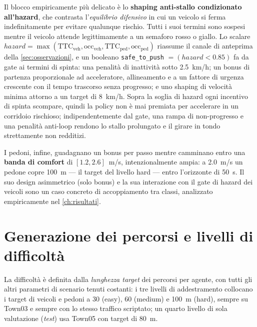 Il blocco empiricamente più delicato è lo \textbf{shaping anti-stallo
condizionato all'hazard}, che contrasta l'\emph{equilibrio difensivo} in
cui un veicolo si ferma indefinitamente per evitare qualunque rischio.
Tutti i suoi termini sono sospesi mentre il veicolo attende
legittimamente a un semaforo rosso o giallo. Lo scalare
$\mathit{hazard} = \max(\text{TTC}_{\mathrm{veh}}, \text{occ}_{\mathrm{veh}},
\text{TTC}_{\mathrm{ped}}, \text{occ}_{\mathrm{ped}})$ riassume il canale
di anteprima della \cref{sec:osservazioni}, e un booleano
\texttt{safe\_to\_push} $= (\mathit{hazard} < 0.85)$ fa da gate ai
termini di spinta: una penalità di inattività sotto 2.5~km/h; un bonus
di partenza proporzionale ad acceleratore, allineamento e a un fattore
di urgenza crescente con il tempo trascorso senza progresso; e uno
shaping di velocità minima attorno a un target di 8~km/h. Sopra la
soglia di hazard ogni incentivo di spinta scompare, quindi la policy non
è mai premiata per accelerare in un corridoio rischioso;
indipendentemente dal gate, una rampa di non-progresso e una penalità
anti-loop rendono lo stallo prolungato e il girare in tondo strettamente
non redditizi.

I pedoni, infine, guadagnano un bonus per passo mentre camminano entro
una \textbf{banda di comfort} di $[1.2, 2.6]$~m/s, intenzionalmente
ampia: a 2.0~m/s un pedone copre \SI{100}{m} --- il target del livello
hard --- entro l'orizzonte di \SI{50}{s}. Il suo design asimmetrico
(solo bonus) e la sua interazione con il gate di hazard dei veicoli sono
un caso concreto di accoppiamento tra classi, analizzato empiricamente
nel \cref{ch:risultati}.

\section{Generazione dei percorsi e livelli di difficoltà}
\label{sec:percorsi}

La difficoltà è definita dalla \emph{lunghezza target} dei percorsi per
agente, con tutti gli altri parametri di scenario tenuti costanti: i tre
livelli di addestramento collocano i target di veicoli e pedoni a 30
(easy), 60 (medium) e \SI{100}{m} (hard), sempre su Town03 e sempre con
lo stesso traffico scriptato; un quarto livello di sola valutazione
(\emph{test}) usa Town05 con target di \SI{80}{m}.

